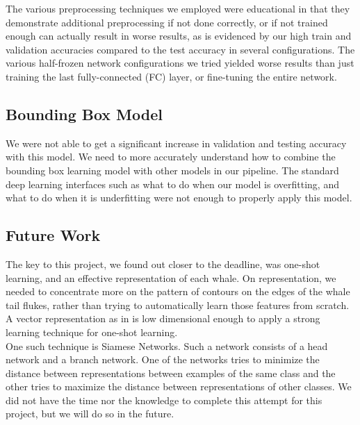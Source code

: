The various preprocessing techniques we employed were educational in that they demonstrate additional preprocessing if not done correctly, or if not trained enough can actually result in worse results, as is evidenced by our high train and validation accuracies compared to the test accuracy in several configurations. The various half-frozen network configurations we tried yielded worse results than just training the last fully-connected (FC) layer, or fine-tuning the entire network.

\subsection{Bounding Box Model}

We were not able to get a significant increase in validation and testing accuracy with this model. We need to more accurately understand how to combine the bounding box learning model with other models in our pipeline. The standard deep learning interfaces such as what to do when our model is overfitting, and what to do when it is underfitting were not enough to properly apply this model. 

\subsection{Future Work}

The key to this project, we found out closer to the deadline, was one-shot learning, and an effective representation of each whale. On representation, we needed to concentrate more on the pattern of contours on the edges of the whale tail flukes, rather than trying to automatically learn those features from scratch. A vector representation as in \cite{weideman2017integral} is low dimensional enough to apply a strong learning technique for one-shot learning.\\


 One such technique is Siamese Networks. Such a network consists of a head network and a branch network. One of the networks tries to minimize the distance between representations between examples of the same class and the other tries to maximize the distance between representations of other classes. We did not have the time nor the knowledge to complete this attempt for this project, but we will do so in the future.